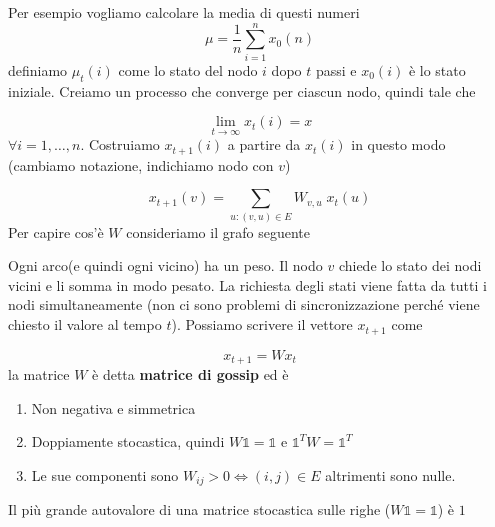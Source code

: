 \documentclass[12pt]{report}
\begin{document}
Per esempio vogliamo calcolare la media di questi numeri
$$\mu = \frac{1}{n}\sum_{i=1}^n x_0(n)$$
definiamo $\mu_t(i)$ come lo stato del nodo $i$ dopo $t$ passi e $x_0(i)$ è lo stato iniziale. Creiamo un processo che converge per ciascun nodo, quindi tale che

$$\lim_{t \rightarrow \infty} x_t(i) = x$$
$\forall i = 1, \dots, n$. Costruiamo $x_{t+1}(i)$ a partire da $x_t(i)$ in questo modo (cambiamo notazione, indichiamo nodo con $v$)

$$x_{t+1}(v) = \sum_{u : (v,u) \in E} W_{v,u}\;x_t(u)$$
Per capire cos'è $W$ consideriamo il grafo seguente

Ogni arco(e quindi ogni vicino) ha un peso. Il nodo $v$ chiede lo stato dei nodi vicini e li somma in modo pesato. La richiesta degli stati viene fatta da tutti i nodi simultaneamente (non ci sono problemi di sincronizzazione perché viene chiesto il valore al tempo $t$). Possiamo scrivere il vettore $x_{t+1}$ come

$$x_{t+1} = W x_t$$
la matrice $W$ è detta \textbf{matrice di gossip} ed è 

\begin{enumerate}
    \item Non negativa e simmetrica
    \item Doppiamente stocastica, quindi $W \mathds{1} = \mathds{1}$ e $\mathds{1}^T W = \mathds{1}^T$
    \item Le sue componenti sono $W_{ij} > 0 \Leftrightarrow (i,j) \in E$ altrimenti sono nulle.
\end{enumerate}

\begin{fatto}
    Il più grande autovalore di una matrice stocastica sulle righe ($W \mathds{1} = \mathds{1}$) è $1$
\end{fatto}
\end{document}

